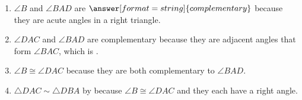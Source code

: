 \documentclass[nooutcomes]{ximera}
\begin{document}
\begin{problem}
\begin{enumerate}
\item $\angle B$ and $\angle BAD$ are $\answer[format=string]{complementary}$ because they are acute angles in a right triangle. 

\item $\angle DAC$ and $\angle BAD$ are complementary because they are adjacent angles that form $\angle BAC$, which is .  

\item $\angle B \cong \angle DAC$ because they are both complementary to $\angle BAD$.  

\item $\triangle DAC\sim \triangle DBA$ by  because $\angle B \cong \angle DAC$ and they each have a right angle.
\end{enumerate}

\end{problem}
\end{document}
